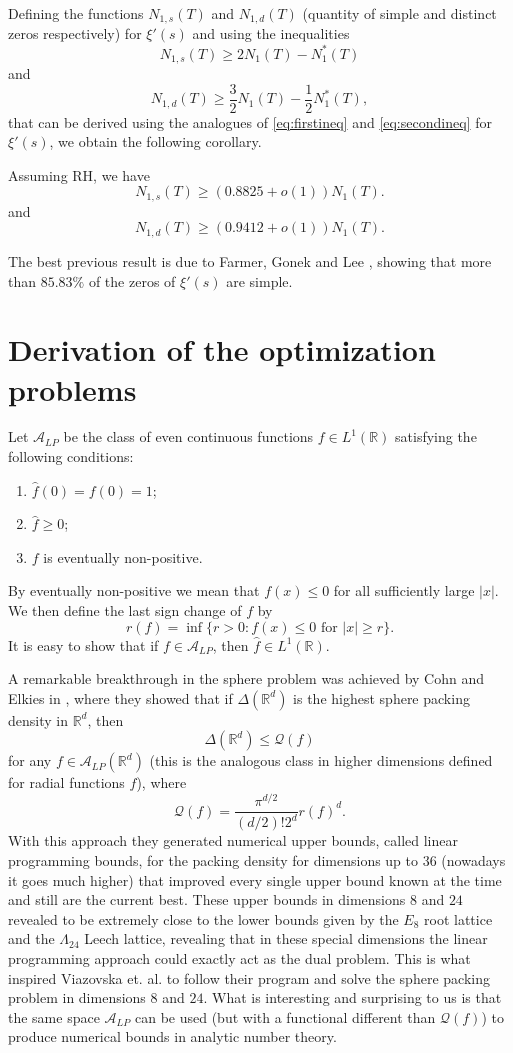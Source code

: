 \documentclass[reqno]{amsart}
\newcommand{\A}{\mathcal{A}}
\newcommand{\Q}{\mathcal{Q}}
\renewcommand{\r}{\mathbb{R}}
\newcommand{\ft}{\widehat}
\begin{document}
Defining the functions $N_{1,s}(T)$ and $N_{1,d}(T)$ (quantity of simple and distinct zeros respectively) for $\xi'(s)$ and using the inequalities
\[
{N_{1,s}(T) \geq 2 N_1(T) - N_1^*(T)}
\]
and
\[
{N_{1,d}(T) \geq \frac{3}{2}N_1(T)-\frac{1}{2}N_1^*(T)},
\]
that can be derived using the analogues of \eqref{eq:firstineq} and \eqref{eq:secondineq} for $\xi'(s)$, we obtain the following corollary. 

\begin{corollary} 
Assuming RH, we have
\[	
N_{1,s}(T)\geq (0.8825+o(1))N_1(T). %
\]
and
\[
N_{1,d}(T)\geq (0.9412+o(1))N_1(T). %
\]
\end{corollary}

The best previous result is due to Farmer, Gonek and Lee \cite{FGL}, showing that more than $85.83\% $ of the zeros of $\xi'(s)$ are simple. 

\section{Derivation of the optimization problems}\label{prelims}

Let $\A_{LP}$ be the class of even continuous functions $f\in L^1(\r)$ satisfying the following conditions:
\begin{enumerate}
\item $\ft f(0)=f(0)=1$;
\item $\ft f\geq 0$;
\item $f$ is eventually non-positive.
\end{enumerate}
By eventually non-positive we mean that $f(x)\leq 0$ for all sufficiently  large $|x|$. We then define the last sign change of $f$ by
\begin{equation*}
r(f)=\inf \big\{r>0: f(x)\leq 0 \text{ for } |x|\geq r\big\}.
\end{equation*}
It is easy to show that if $f\in\A_{LP}$, then $\ft f \in L^1(\r)$.

A remarkable breakthrough in the sphere problem was achieved by Cohn and Elkies in \cite{CE}, where they showed that if $\Delta(\r^d)$ is the highest sphere packing density in $\r^d$, then
$$
\Delta(\r^d) \leq \Q(f)
$$
for any $f\in  \A_{LP}(\r^d)$ (this is the analogous class in higher dimensions defined for radial functions $f$), where
$$
\Q(f) = \frac{\pi^{d/2}}{(d/2)!2^{d}}r(f)^d.
$$ 
With this approach they generated numerical upper bounds, called linear programming bounds, for the packing density for dimensions up to $36$ (nowadays it goes much higher) that improved every single upper bound known at the time and still are the current best. These upper bounds in dimensions $8$ and $24$ revealed to be extremely close to the lower bounds given by the $E_8$ root lattice and the $\Lambda_{24}$ Leech lattice, revealing that in these special dimensions the linear programming approach could exactly act as the dual problem. This is what inspired Viazovska et. al. \cite{V,CKMRV} to follow their program and solve the sphere packing problem in dimensions $8$ and $24$. What is interesting and surprising to us is that the same space $\A_{LP}$ can be used (but with a functional different than $\Q(f)$) to produce numerical bounds in analytic number theory. 
\end{document}
